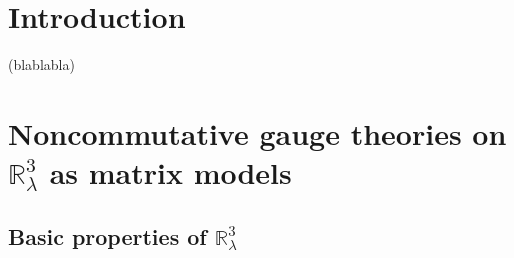 \documentclass[a4paper,11pt,twoside]{article}
\numberwithin{equation}{section}
\theoremstyle{nonumberplain}
\newcounter{and}
\begin{document}
\newpage

\section{Introduction}


(blablabla)


\section{\texorpdfstring{Noncommutative gauge theories on $\mathbb{R}^3_\lambda$ as matrix models}{Matrix gauge models}} \label{section2}

\subsection{\texorpdfstring{Basic properties of $\mathbb{R}^3_\lambda$}{R3l}}\label{subsection21}
\end{document}
